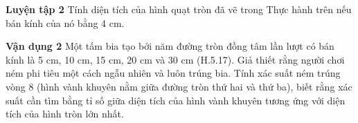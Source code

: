 \begin{lesson}
    \answerline
    \answerline
    \answerline
    \answerline

    \textbf{Luyện tập 2} Tính diện tích của hình quạt tròn đã vẽ trong Thực hành trên nếu bán kính của nó bằng 4 cm.

    \answerline
    \answerline

    \textbf{Vận dụng 2} Một tấm bia tạo bởi năm đường tròn đồng tâm lần lượt có bán kính là 5 cm, 10 cm, 15 cm, 20 cm và 30 cm (H.5.17). Giả thiết rằng người chơi ném phi tiêu một cách ngẫu nhiên và luôn trúng bia. Tính xác suất ném trúng vòng 8 (hình vành khuyên nằm giữa đường tròn thứ hai và thứ ba), biết rằng xác suất cần tìm bằng tỉ số giữa diện tích của hình vành khuyên tương ứng với diện tích của hình tròn lớn nhất.


    \answerline
    \answerline
    \answerline
\end{lesson}

